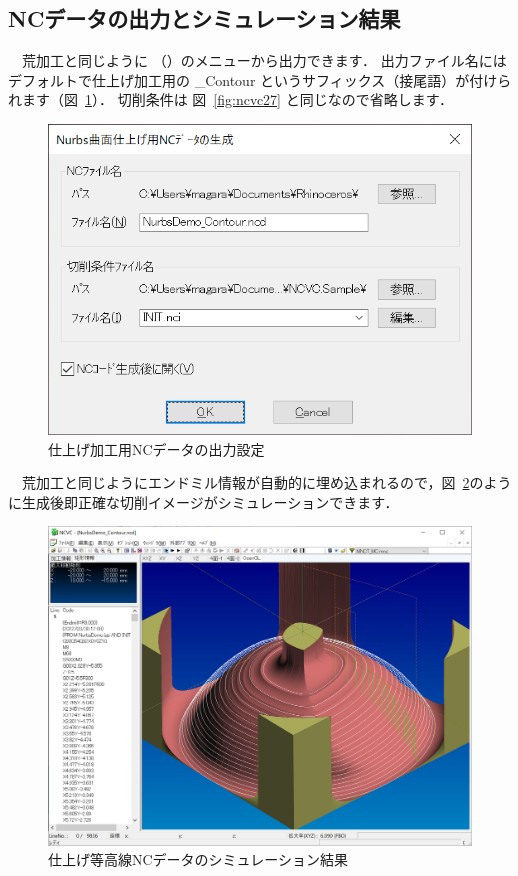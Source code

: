 \newpage
\subsection{NCデータの出力とシミュレーション結果}
　荒加工と同じように （）のメニューから出力できます．
出力ファイル名にはデフォルトで仕上げ加工用の \_Contour というサフィックス（接尾語）が付けられます（図~\ref{fig:ncvc34}）．
切削条件は 図~\ref{fig:ncvc27} と同じなので省略します．

\begin{figure}[H]
\centering
\includegraphics[scale=0.7]{No3/fig/fig34.png}
\caption{仕上げ加工用NCデータの出力設定}
\label{fig:ncvc34}
\end{figure}

　荒加工と同じようにエンドミル情報が自動的に埋め込まれるので，図~\ref{fig:ncvc35}のように生成後即正確な切削イメージがシミュレーションできます．

\begin{figure}[H]
\centering
\includegraphics[scale=0.5]{No3/fig/fig35.png}
\caption{仕上げ等高線NCデータのシミュレーション結果}
\label{fig:ncvc35}
\end{figure}

